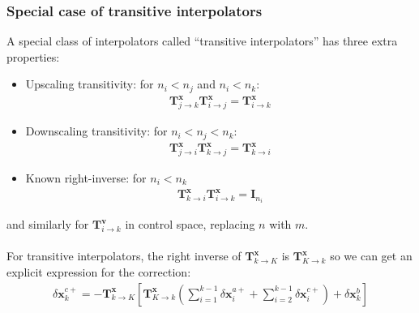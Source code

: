 \documentclass[12pt]{scrartcl}
\begin{document}
\subsubsection{Special case of transitive interpolators}
A special class of interpolators called ``transitive interpolators'' has three extra properties:
\begin{itemize}
\item Upscaling transitivity: for $n_i < n_j$ and $n_i < n_k$:
\begin{align}
\mathbf{T}^\mathbf{x}_{j \rightarrow k} \mathbf{T}^\mathbf{x}_{i \rightarrow j} = \mathbf{T}^\mathbf{x}_{i \rightarrow k}
\end{align}
\item Downscaling transitivity: for $n_i < n_j < n_k$:
\begin{align}
\mathbf{T}^\mathbf{x}_{j \rightarrow i} \mathbf{T}^\mathbf{x}_{k \rightarrow j} = \mathbf{T}^\mathbf{x}_{k \rightarrow i}
\end{align}
\item Known right-inverse: for $n_i < n_k$
\begin{align}
\mathbf{T}^\mathbf{x}_{k \rightarrow i} \mathbf{T}^\mathbf{x}_{i \rightarrow k} = \mathbf{I}_{n_i}
\end{align}
\end{itemize}
and similarly for $\mathbf{T}^\mathbf{v}_{i \rightarrow k}$ in control space, replacing $n$ with $m$.\\
$  $\\
For transitive interpolators, the right inverse of $\mathbf{T}^\mathbf{x}_{k \rightarrow K}$ is $\mathbf{T}^\mathbf{x}_{K \rightarrow k}$ so we can get an explicit expression for the correction:
\begin{align}
\label{eq:standard_correction}
\boxed{\delta \mathbf{x}^{c+}_k = - \mathbf{T}^\mathbf{x}_{k \rightarrow K} \left[\mathbf{T}^\mathbf{x}_{K \rightarrow k} \left(\sum_{i=1}^{k-1} \delta \mathbf{x}^{a+}_i + \sum_{i=2}^{k-1} \delta \mathbf{x}^{c+}_i\right) + \delta \mathbf{x}^b_k\right]}
\end{align}
\end{document}
